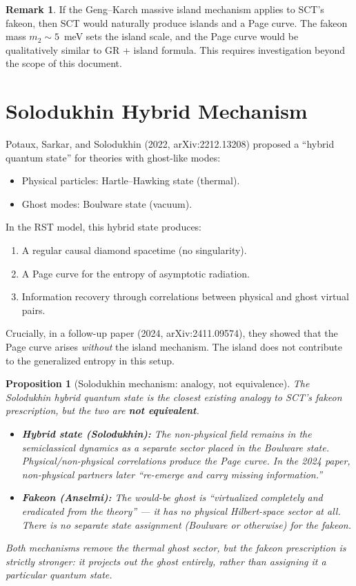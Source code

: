 \documentclass[11pt,a4paper]{article}
\theoremstyle{plain}
\newtheorem{proposition}[theorem]{Proposition}
\theoremstyle{definition}
\newtheorem{remark}[theorem]{Remark}
\begin{document}
\begin{remark}
If the Geng--Karch massive island mechanism applies to SCT's fakeon,
then SCT would naturally produce islands and a Page curve.  The
fakeon mass $m_2 \sim 5$~meV sets the island scale, and the Page
curve would be qualitatively similar to GR + island formula.
This requires investigation beyond the scope of this document.
\end{remark}


\section{Solodukhin Hybrid Mechanism}
\label{sec:solodukhin}

Potaux, Sarkar, and Solodukhin (2022, arXiv:2212.13208) proposed a
``hybrid quantum state'' for theories with ghost-like modes:
\begin{itemize}
\item Physical particles: Hartle--Hawking state (thermal).
\item Ghost modes: Boulware state (vacuum).
\end{itemize}

In the RST model, this hybrid state produces:
\begin{enumerate}
\item A regular causal diamond spacetime (no singularity).
\item A Page curve for the entropy of asymptotic radiation.
\item Information recovery through correlations between physical
      and ghost virtual pairs.
\end{enumerate}

Crucially, in a follow-up paper (2024, arXiv:2411.09574), they showed
that the Page curve arises \emph{without} the island mechanism.  The
island does not contribute to the generalized entropy in this setup.

\begin{proposition}[Solodukhin mechanism: analogy, not equivalence]
The Solodukhin hybrid quantum state is the \emph{closest existing
analogy} to SCT's fakeon prescription, but the two are \textbf{not
equivalent}.
\begin{itemize}
\item \textbf{Hybrid state (Solodukhin):} The non-physical field
  remains in the semiclassical dynamics as a separate sector placed
  in the Boulware state.  Physical/non-physical correlations produce
  the Page curve.  In the 2024 paper, non-physical partners later
  ``re-emerge and carry missing information.''
\item \textbf{Fakeon (Anselmi):} The would-be ghost is ``virtualized
  completely and eradicated from the theory'' --- it has no physical
  Hilbert-space sector at all.  There is no separate state assignment
  (Boulware or otherwise) for the fakeon.
\end{itemize}
Both mechanisms remove the thermal ghost sector, but the fakeon
prescription is \emph{strictly stronger}: it projects out the ghost
entirely, rather than assigning it a particular quantum state.
\end{proposition}
\end{document}
